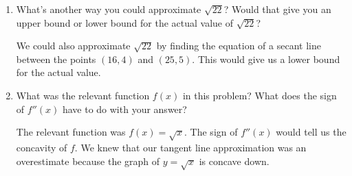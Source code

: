 \documentclass{article}
\begin{document}
\begin{enumerate}[resume, topsep=0pt]
\begin{enumerate}
\begin{solution}
    \end{solution}

  \item


    \begin{problem}[\stretch{0.75}]
      What's another way you could approximate $\sqrt{22}$? Would that give you an upper bound or lower bound for the actual value of $\sqrt{22}$? 
    \end{problem}

    \begin{solution}
      We could also approximate $\sqrt{22}$ by finding the equation of a secant line
      between the points $(16, 4)$ and $(25, 5)$. This would give us a lower bound
      for the actual value.

    \end{solution}

  \item
    \begin{problem}[\nstretch{0.15}]
      What was the relevant function $f(x)$ in this problem?  What does
      the sign of $f''(x)$ have to do with your answer?
    \end{problem}

    \begin{solution}
        The relevant function was $f(x)=\sqrt{x}$. The sign of $f''(x)$ would tell
        us the concavity of $f$. We knew that our tangent line approximation was an
        overestimate because the graph of $y=\sqrt{x}$ is concave down.
    \end{solution}


\end{enumerate}
\end{enumerate}
\end{document}
